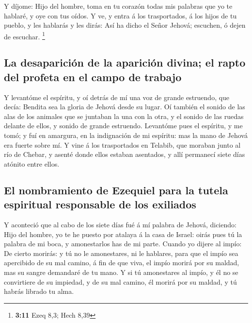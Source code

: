  Y díjome: Hijo del hombre, toma en tu corazón todas mis
palabras que yo te hablaré, y oye con tus oídos.  Y ve, y
entra á los trasportados, á los hijos de tu pueblo, y les hablarás y les
dirás: Así ha dicho el Señor Jehová; escuchen, ó dejen de escuchar.
\footnote{\textbf{3:11} Ezeq 8,3; Hech 8,39}

\hypertarget{la-desapariciuxf3n-de-la-apariciuxf3n-divina-el-rapto-del-profeta-en-el-campo-de-trabajo}{%
\subsection{La desaparición de la aparición divina; el rapto del profeta
en el campo de
trabajo}\label{la-desapariciuxf3n-de-la-apariciuxf3n-divina-el-rapto-del-profeta-en-el-campo-de-trabajo}}

 Y levantóme el espíritu, y oí detrás de mí una voz de
grande estruendo, que decía: Bendita sea la gloria de Jehová desde su
lugar.  Oí también el sonido de las alas de los animales
que se juntaban la una con la otra, y el sonido de las ruedas delante de
ellos, y sonido de grande estruendo.  Levantóme pues el
espíritu, y me tomó; y fuí en amargura, en la indignación de mi
espíritu: mas la mano de Jehová era fuerte sobre mí.  Y
vine á los trasportados en Telabib, que moraban junto al río de Chebar,
y asenté donde ellos estaban asentados, y allí permanecí siete días
atónito entre ellos.

\hypertarget{el-nombramiento-de-ezequiel-para-la-tutela-espiritual-responsable-de-los-exiliados}{%
\subsection{El nombramiento de Ezequiel para la tutela espiritual
responsable de los
exiliados}\label{el-nombramiento-de-ezequiel-para-la-tutela-espiritual-responsable-de-los-exiliados}}

 Y aconteció que al cabo de los siete días fué á mí palabra
de Jehová, diciendo:  Hijo del hombre, yo te he puesto por
atalaya á la casa de Israel: oirás pues tú la palabra de mi boca, y
amonestarlos has de mi parte.  Cuando yo dijere al impío:
De cierto morirás: y tú no le amonestares, ni le hablares, para que el
impío sea apercibido de su mal camino, á fin de que viva, el impío
morirá por su maldad, mas su sangre demandaré de tu mano. 
Y si tú amonestares al impío, y él no se convirtiere de su impiedad, y
de su mal camino, él morirá por su maldad, y tú habrás librado tu alma.

